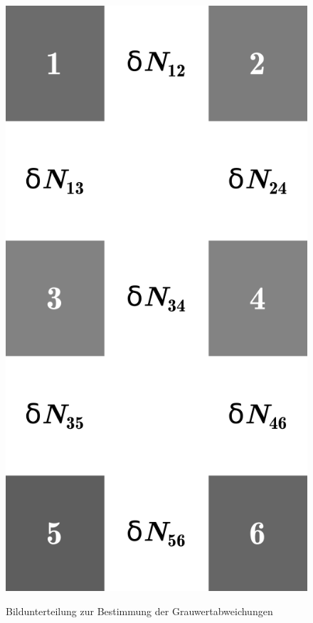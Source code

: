 \documentclass{article}
\begin{document}
\begin{figure}[h!]
{		\includegraphics[height=0.3\textheight]{pictures/Raster_delta_n.png}
		\label{pic:raster_delta_n}
	}
	\caption{Bildunterteilung zur Bestimmung der Grauwertabweichungen}
\end{figure}


\FloatBarrier
\end{document}
